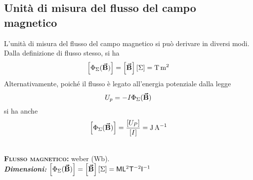 \subsection{Unità di misura del flusso del campo magnetico}
L'unità di misura del flusso del campo magnetico si può derivare in diversi modi. Dalla definizione di flusso stesso, si ha
\begin{equation*}
	\left[\Phi_{\Sigma}(\vba{B})\right]=\left[\vba{B}\right]\left[\Sigma\right]=\unit{\tesla\meter\squared}
\end{equation*}
Alternativamente, poiché il flusso è legato all'energia potenziale dalla legge
\begin{equation*}
	U_p=-I\Phi_{\Sigma}(\vb*{\va{B}})
\end{equation*}
si ha anche
\begin{equation*}
	\left[\Phi_{\Sigma}(\vba{B})\right]=\frac{\left[U_P\right]}{\left[I\right]}=\unit{\joule\per\ampere}
\end{equation*}
\begin{units}~\\
	\textbf{\textsc{Flusso magnetico:}} weber ($\unit{\weber}$).\\
	\textit{\textbf{Dimensioni:}} $\left[\Phi_{\Sigma}(\vb*{\va{B}})\right]=\left[\vb*{\va{B}}\right]\left[\Sigma\right]=\mathsf{M}\mathsf{L}^2 \mathsf{T}^{-2}  \mathsf{I}^{-1}$
\end{units}